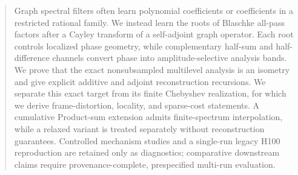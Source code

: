 \begin{abstract}
Graph spectral filters often learn polynomial coefficients or coefficients in a
restricted rational family.  We instead learn the roots of Blaschke all-pass
factors after a Cayley transform of a self-adjoint graph operator.  Each root
controls localized phase geometry, while complementary half-sum and
half-difference channels convert phase into amplitude-selective analysis
bands.  We prove that the exact nonsubsampled multilevel analysis is an
isometry and give explicit additive and adjoint reconstruction recursions.  We
separate this exact target from its finite Chebyshev realization, for which we
derive frame-distortion, locality, and sparse-cost statements.  A cumulative
Product-sum extension admits finite-spectrum interpolation, while a relaxed
variant is treated separately without reconstruction guarantees.  Controlled
mechanism studies and a single-run legacy H100 reproduction are retained only
as diagnostics; comparative downstream claims require provenance-complete,
prespecified multi-run evaluation.
\end{abstract}
